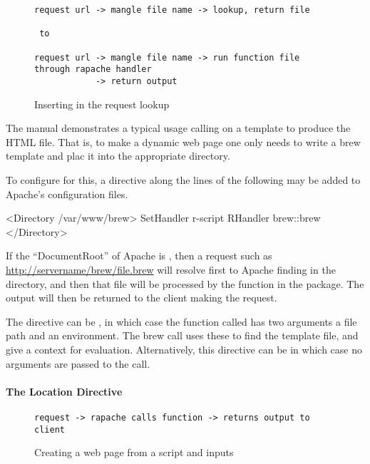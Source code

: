 \begin{figure}
  \centering
\begin{verbatim}
request url -> mangle file name -> lookup, return file

 to

request url -> mangle file name -> run function file through rapache handler
            -> return output
\end{verbatim}
  \caption{Inserting  in the request lookup}
  \label{sec:rapache-brew}
\end{figure}


The  manual demonstrates a typical usage calling
 on a template to produce the HTML file.  That is, to
make a dynamic web page one only needs to write a brew template and
plac it into the appropriate directory.

To configure  for this, a directive along the lines of
the following may be added to Apache's configuration files.
\begin{HTMLinput}
<Directory /var/www/brew>
  SetHandler r-script
  RHandler brew::brew
</Directory>
\end{HTMLinput}

If the ``DocumentRoot'' of Apache is , then a request
such as \url{http://servername/brew/file.brew} will resolve first to
Apache finding  in the 
directory, and then that file will be processed by the 
function in the  package. The output will then be returned
to the client making the request. 

The  directive can be , in which case
the function called has two arguments a file path and an
environment. The brew call uses these to find the template file, and
give a context for evaluation. Alternatively, this directive can be
 in which case no arguments are passed to the call.

\paragraph{The Location Directive}


\begin{figure}
  \centering
\begin{verbatim}
request -> rapache calls function -> returns output to client
\end{verbatim}
  \caption{Creating a web page from a script and inputs}
  \label{fig:rapache-location-directive}
\end{figure}

